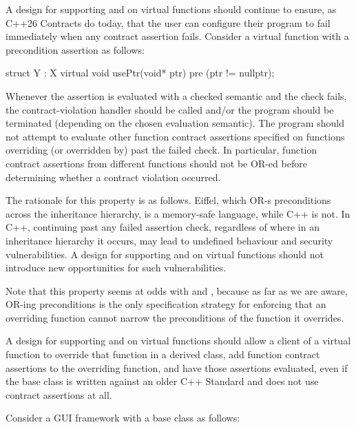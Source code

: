 
A design for supporting  and  on virtual functions should continue to ensure, as C++26 Contracts do today, that the user can configure their program to fail immediately when any contract assertion fails. Consider a virtual function with a precondition assertion as follows:
\begin{codeblock}
struct Y : X {
  virtual void usePtr(void* ptr) 
    pre (ptr != nullptr);
}
\end{codeblock}
Whenever the assertion \mbox{} is evaluated with a checked semantic and the check fails, the contract-violation handler should be called and/or the program should be terminated (depending on the chosen evaluation semantic). The program should not attempt to evaluate other function contract assertions specified on functions overriding (or overridden by)  past the failed check. In particular, function contract assertions from different functions should not be OR-ed before determining whether a contract violation occurred.

The rationale for this property is as follows. Eiffel, which OR-s preconditions across the inheritance hierarchy, is a memory-safe language, while C++ is not. In C++, continuing past any failed assertion check, regardless of where in an inheritance hierarchy it occurs, may lead to undefined behaviour and security vulnerabilities. A design for supporting  and  on virtual functions should not introduce new opportunities for such vulnerabilities.

Note that this property seems at odds with  and , because as far as we are aware, OR-ing preconditions is the only specification strategy for enforcing that an overriding function cannot narrow the preconditions of the function it overrides.


A design for supporting  and  on virtual functions should allow a client of a virtual function to override that function in a derived class, add function contract assertions to the overriding function, and have those assertions evaluated, even if the base class is written against an older C++ Standard and does not use contract assertions at all.

Consider a GUI framework with a  base class as follows:

